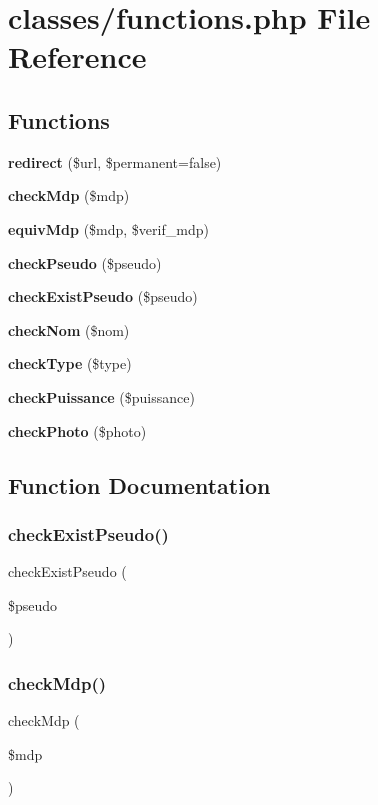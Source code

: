 \section{classes/functions.php File Reference}
\label{functions_8php}
\subsection*{Functions}
\begin{DoxyCompactItemize}
\item 
\textbf{ redirect} (\$url, \$permanent=false)
\item 
\textbf{ check\+Mdp} (\$mdp)
\item 
\textbf{ equiv\+Mdp} (\$mdp, \$verif\+\_\+mdp)
\item 
\textbf{ check\+Pseudo} (\$pseudo)
\item 
\textbf{ check\+Exist\+Pseudo} (\$pseudo)
\item 
\textbf{ check\+Nom} (\$nom)
\item 
\textbf{ check\+Type} (\$type)
\item 
\textbf{ check\+Puissance} (\$puissance)
\item 
\textbf{ check\+Photo} (\$photo)
\end{DoxyCompactItemize}


\subsection{Function Documentation}
\mbox{\label{functions_8php_acb78b0705cc9c711c964eda508d9eb1a}} 
\subsubsection{check\+Exist\+Pseudo()}
{\footnotesize\ttfamily check\+Exist\+Pseudo (\begin{DoxyParamCaption}\item[{}]{\$pseudo }\end{DoxyParamCaption})}

\mbox{\label{functions_8php_a56dd69c5fa715f03a5c9fbd05f83658b}} 
\subsubsection{check\+Mdp()}
{\footnotesize\ttfamily check\+Mdp (\begin{DoxyParamCaption}\item[{}]{\$mdp }\end{DoxyParamCaption})}

